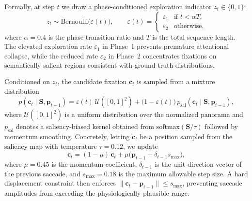 \documentclass[sigconf]{acmart}
\begin{document}
Formally, at step $t$ we draw a phase-conditioned exploration indicator $z_t \in \{0,1\}$:
\begin{equation}
  z_t \sim \mathrm{Bernoulli}\bigl(\varepsilon(t)\bigr), \qquad
  \varepsilon(t) =
  \begin{cases}
    \varepsilon_1 & \text{if } t < \alpha T, \\
    \varepsilon_2 & \text{otherwise,}
  \end{cases}
  \label{eq:hgs_eps}
\end{equation}
where $\alpha = 0.4$ is the phase transition ratio and $T$ is the total sequence length. The elevated exploration rate $\varepsilon_1$ in Phase~1 prevents premature attentional collapse, while the reduced rate $\varepsilon_2$ in Phase~2 concentrates fixations on semantically salient regions consistent with ground-truth distributions.

Conditioned on $z_t$, the candidate fixation $\mathbf{c}_t$ is sampled from a mixture distribution
\begin{equation}
  p(\mathbf{c}_t \mid \mathbf{S}, \mathbf{p}_{t-1})
  = \varepsilon(t)\,\mathcal{U}([0,1]^2)
    + \bigl(1 - \varepsilon(t)\bigr)\,p_{\text{sal}}(\mathbf{c}_t \mid \mathbf{S}, \mathbf{p}_{t-1}),
  \label{eq:hgs_mixture}
\end{equation}
where $\mathcal{U}([0,1]^2)$ is a uniform distribution over the normalized panorama and $p_{\text{sal}}$ denotes a saliency-biased kernel obtained from $\mathrm{softmax}(\mathbf{S}/\tau)$ followed by momentum smoothing. Concretely, letting $\tilde{\mathbf{c}}_t$ be a position sampled from the saliency map with temperature $\tau = 0.12$, we update
\begin{equation}
  \mathbf{c}_t
  = (1-\mu)\,\tilde{\mathbf{c}}_t
    + \mu \bigl(\mathbf{p}_{t-1} + \delta_{t-1} s_{\max}\bigr),
  \label{eq:hgs_momentum}
\end{equation}
where $\mu = 0.45$ is the momentum coefficient, $\delta_{t-1}$ is the unit direction vector of the previous saccade, and $s_{\max} = 0.18$ is the maximum allowable step size. A hard displacement constraint then enforces $\|\mathbf{c}_t - \mathbf{p}_{t-1}\| \le s_{\max}$, preventing saccade amplitudes from exceeding the physiologically plausible range.
\end{document}
